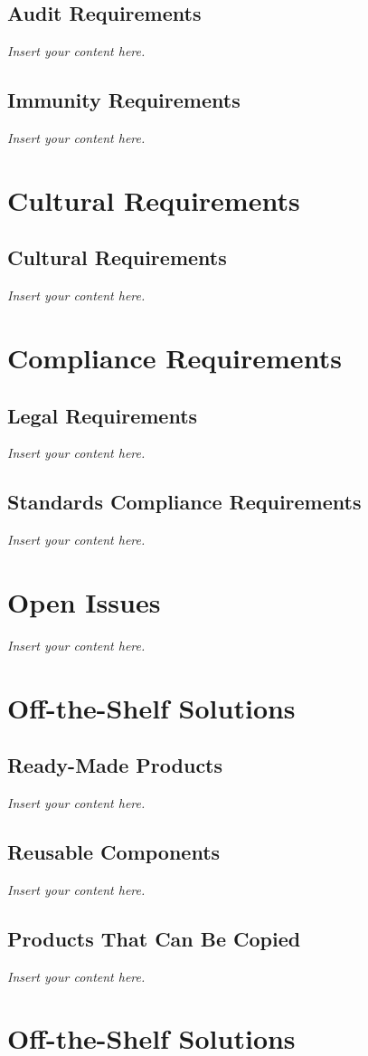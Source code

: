 \documentclass[12pt]{article}
\newcommand{\lips}{\textit{Insert your content here.}}
\begin{document}
\subsection{Audit Requirements}
\lips
\subsection{Immunity Requirements}
\lips

\section{Cultural Requirements}
\subsection{Cultural Requirements}
\lips

\section{Compliance Requirements}
\subsection{Legal Requirements}
\lips
\subsection{Standards Compliance Requirements}
\lips

\section{Open Issues}
\lips

\section{Off-the-Shelf Solutions}
\subsection{Ready-Made Products}
\lips
\subsection{Reusable Components}
\lips
\subsection{Products That Can Be Copied}
\lips
\section{Off-the-Shelf Solutions}
\end{document}

